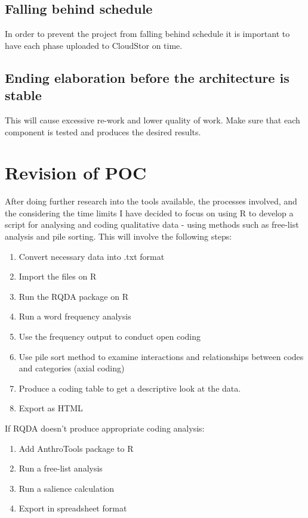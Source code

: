 \documentclass{article}
\begin{document}
\subsection{Falling behind schedule}
In order to prevent the project from falling behind schedule it is important to have each phase uploaded to CloudStor on time.

\subsection{Ending elaboration before the architecture is stable}
This will cause excessive re-work and lower quality of work. Make sure that each component is tested and produces the desired results.

\section{Revision of POC}
After doing further research into the tools available, the processes involved, and the considering the time limits I have decided to focus on using R to develop a script for analysing and coding qualitative data - using methods such as free-list analysis and pile sorting. This will involve the following steps:
\begin{enumerate}
    \item Convert necessary data into .txt format
    \item Import the files on R 
    \item Run the RQDA package on R 
    \item Run a word frequency analysis
    \item Use the frequency output to conduct open coding
    \item Use pile sort method to examine interactions and relationships between codes and categories (axial coding)
    \item Produce a coding table to get a descriptive look at the data.
    \item Export as HTML
\end{enumerate}
If RQDA doesn't produce appropriate coding analysis:
\begin{enumerate}
    \item Add AnthroTools package to R \item Run a free-list analysis
    \item Run a salience calculation 
    \item Export in spreadsheet format
\end{enumerate}
\end{document}

